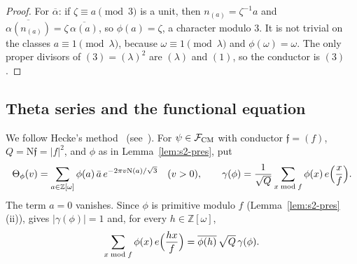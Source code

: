 \documentclass[11pt]{article}
\numberwithin{equation}{section}
\newcommand{\OO}{\mathbb Z[\omega]}
\newcommand{\N}{\mathrm N}
\begin{document}
\begin{proof}
For $\overline\alpha$: if $\zeta\equiv a\pmod3$ is a unit, then $n_{(a)}=\zeta^{-1}a$ and
$\overline{\alpha(n_{(a)})}=\zeta\,\overline{\alpha(a)}$, so $\phi(a)=\zeta$, a character modulo $3$. It is not
trivial on the classes $a\equiv1\pmod\lambda$, because $\omega\equiv1\pmod\lambda$ and $\phi(\omega)=\omega$.
The only proper divisors of $(3)=(\lambda)^2$ are $(\lambda)$ and $(1)$, so the conductor is $(3)$.
\end{proof}

\subsection{Theta series and the functional equation}\label{sec:s2-fe}
We follow Hecke's method~\cite{Hec20} (see~\cite[Ch.~VII, \S\S7--8]{Neukirch}). For $\psi\in\mathcal F_{\rm CM}$ with conductor $\mathfrak f=(f)$, $Q=\N\mathfrak f=|f|^2$, and $\phi$ as in
Lemma~\ref{lem:s2-pres}, put
\begin{equation}\label{eq:d147}
 \Theta_\phi(v)=\sum_{a\in\OO}\phi(a)\,\bar a\,e^{-2\pi v\N(a)/\sqrt3}\quad(v>0),\qquad
 \gamma(\phi)=\frac1{\sqrt Q}\sum_{x\bmod f}\phi(x)\,e\Bigl(\frac xf\Bigr).
\end{equation}
The term $a=0$ vanishes. Since $\phi$ is primitive modulo $f$ (Lemma~\ref{lem:s2-pres}(ii)),
\cite[Lemma~17]{QF} gives $|\gamma(\phi)|=1$ and, for every $h\in\OO$,
\begin{equation}\label{eq:s2-gauss}
 \sum_{x\bmod f}\phi(x)\,e\Bigl(\frac{hx}f\Bigr)=\overline{\phi(h)}\,\sqrt Q\,\gamma(\phi).
\end{equation}
\end{document}
